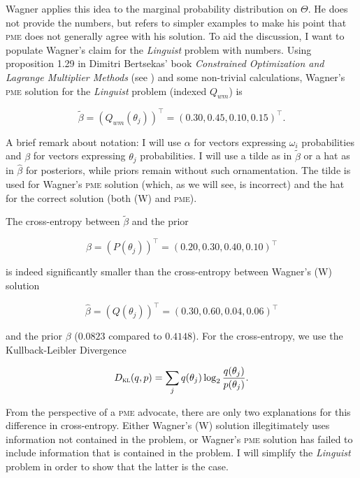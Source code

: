 \documentclass[phd,12pt,oneside]{ubcthesis}
\begin{document}
Wagner applies this idea to the marginal probability distribution on
$\Theta$. He does not provide the numbers, but refers to simpler
examples to make his point that \textsc{pme} does not generally agree with his
solution. To aid the discussion, I want to populate Wagner's claim for
the \emph{Linguist} problem with numbers. Using proposition 1.29 in
Dimitri Bertsekas' book \emph{Constrained Optimization and Lagrange
  Multiplier Methods} (see ) and some
non-trivial calculations, Wagner's \textsc{pme} solution for the
\emph{Linguist} problem (indexed $Q_{wm}$) is

\begin{equation}
  \label{eq:p13}
  \tilde{\beta}=(Q_{wm}(\theta_{j}))^{\intercal}=(0.30,0.45,0.10,0.15)^{\intercal}.
\end{equation}

{\noindent}A brief remark about notation: I will use $\alpha$ for vectors
expressing $\omega_{i}$ probabilities and $\beta$ for vectors
expressing $\theta_{j}$ probabilities. I will use a tilde as in
$\tilde{\beta}$ or a hat as in $\hat{\beta}$ for posteriors, while
priors remain without such ornamentation. The tilde is used for
Wagner's \textsc{pme} solution (which, as we will see, is incorrect) and the
hat for the correct solution (both (W) and \textsc{pme}).

The cross-entropy between $\tilde{\beta}$ and the prior

\begin{equation}
  \label{eq:p14}
  \beta=(P(\theta_{j}))^{\intercal}=(0.20,0.30,0.40,0.10)^{\intercal}
\end{equation}

{\noindent}is indeed significantly smaller than the cross-entropy between
Wagner's (W) solution 

\begin{equation}
  \label{eq:p15}
  \hat{\beta}=(Q(\theta_{j}))^{\intercal}=(0.30,0.60,0.04,0.06)^{\intercal}
\end{equation}

{\noindent}and the prior $\beta$ ($0.0823$ compared to $0.4148$). For the
cross-entropy, we use the Kullback-Leibler Divergence

\begin{equation}
  \label{eq:kl}
  D_{\textsc{kl}}(q,p)=\sum_{j}q(\theta_{j})\log_{2}\frac{q(\theta_{j})}{p(\theta_{j})}.
\end{equation}

From the perspective of a \textsc{pme} advocate, there are only two
explanations for this difference in cross-entropy. Either Wagner's (W)
solution illegitimately uses information not contained in the problem,
or Wagner's \textsc{pme} solution has failed to include information that is
contained in the problem. I will simplify the \emph{Linguist} problem
in order to show that the latter is the case.
\end{document}

